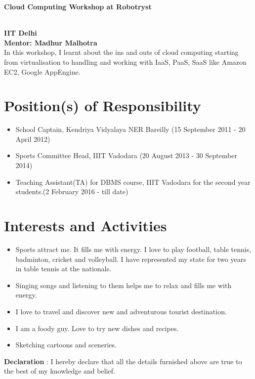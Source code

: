 \documentclass{article}
\begin{document}
\begin{large}\textbf{Cloud Computing Workshop at Robotryst}\\ \\
\end{large}
\textbf{IIT Delhi} \\
\textbf{Mentor: Madhur Malhotra}\\
In this workshop, I learnt about the ins and outs of cloud computing starting from virtualisation to handling and working with IaaS, PaaS, SaaS like Amazon EC2, Google AppEngine.\\




\section{Position(s) of Responsibility}
\begin{itemize}
\item School Captain, Kendriya Vidyalaya NER Bareilly (15 September 2011 - 20 April 2012)
\item Sports Committee Head, IIIT Vadodara (20 August 2013 - 30 September 2014)
\item Teaching Assistant(TA) for DBMS course, IIIT Vadodara for the second year students.(2 February 2016 - till date)
\end{itemize}

\section{Interests and Activities}
\begin{itemize}
\item Sports attract me. It fills me with energy. I love to play football, table tennis, badminton, cricket and  volleyball. I have represented my state for two years in table tennis at the nationals.
\item Singing songs and listening to them helps me to relax and fills me with energy.
\item I love to travel and discover new and adventurous tourist destination. 
\item I am a foody guy. Love to try new dishes and recipes.
\item Sketching cartoons and sceneries. 
\end{itemize}



\vspace*{1cm}
\textbf{Declaration} : I hereby declare that all the details furnished above are true to the best of my knowledge and belief.
\end{document}
